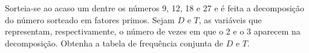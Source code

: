 %
%


\begin{exercicioBanco}[\valorquestao]
    Sorteia-se ao acaso um dentre os números 9, 12, 18 e 27 e é feita a decomposição do número sorteado em fatores primos. Sejam \(D\) e \(T\), as variáveis que representam, respectivamente, o número de vezes em que o 2 e o 3 aparecem na decomposição. Obtenha a tabela de frequência conjunta de \(D\) e \(T\).
\end{exercicioBanco}

